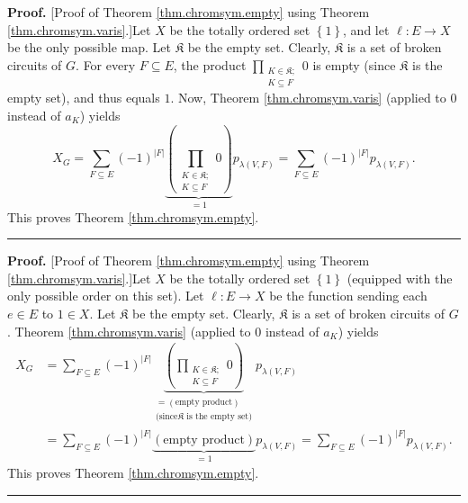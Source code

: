 \documentclass[numbers=enddot,12pt,final,onecolumn,notitlepage]{scrartcl}%
\theoremstyle{definition}
\newenvironment{proof}[1][Proof]{\noindent\textbf{#1.} }{\ \rule{0.5em}{0.5em}}
\newenvironment{verlong}{}{}
\newenvironment{vershort}{}{}
\let\sumnonlimits\sum
\let\prodnonlimits\prod
\renewcommand{\sum}{\sumnonlimits\limits}
\renewcommand{\prod}{\prodnonlimits\limits}
\begin{document}
\begin{vershort}
\begin{proof}
[Proof of Theorem \ref{thm.chromsym.empty} using Theorem
\ref{thm.chromsym.varis}.]Let $X$ be the totally ordered set $\left\{
1\right\}  $, and let $\ell:E\rightarrow X$ be the only possible map. Let
$\mathfrak{K}$ be the empty set. Clearly, $\mathfrak{K}$ is a set of broken
circuits of $G$. For every $F\subseteq E$, the product $\prod_{\substack{K\in
\mathfrak{K};\\K\subseteq F}}0$ is empty (since $\mathfrak{K}$ is the empty
set), and thus equals $1$. Now, Theorem \ref{thm.chromsym.varis} (applied to
$0$ instead of $a_{K}$) yields%
\[
X_{G}=\sum_{F\subseteq E}\left(  -1\right)  ^{\left\vert F\right\vert
}\underbrace{\left(  \prod_{\substack{K\in\mathfrak{K};\\K\subseteq
F}}0\right)  }_{=1}p_{\lambda\left(  V,F\right)  }=\sum_{F\subseteq E}\left(
-1\right)  ^{\left\vert F\right\vert }p_{\lambda\left(  V,F\right)  }.
\]
This proves Theorem \ref{thm.chromsym.empty}.
\end{proof}
\end{vershort}

\begin{verlong}
\begin{proof}
[Proof of Theorem \ref{thm.chromsym.empty} using Theorem
\ref{thm.chromsym.varis}.]Let $X$ be the totally ordered set $\left\{
1\right\}  $ (equipped with the only possible order on this set). Let
$\ell:E\rightarrow X$ be the function sending each $e\in E$ to $1\in X$. Let
$\mathfrak{K}$ be the empty set. Clearly, $\mathfrak{K}$ is a set of broken
circuits of $G$. Theorem \ref{thm.chromsym.varis} (applied to $0$ instead of
$a_{K}$) yields%
\begin{align*}
X_{G}  &  =\sum_{F\subseteq E}\left(  -1\right)  ^{\left\vert F\right\vert
}\underbrace{\left(  \prod_{\substack{K\in\mathfrak{K};\\K\subseteq
F}}0\right)  }_{\substack{=\left(  \text{empty product}\right)  \\\text{(since
}\mathfrak{K}\text{ is the empty set)}}}p_{\lambda\left(  V,F\right)  }\\
&  =\sum_{F\subseteq E}\left(  -1\right)  ^{\left\vert F\right\vert
}\underbrace{\left(  \text{empty product}\right)  }_{=1}p_{\lambda\left(
V,F\right)  }=\sum_{F\subseteq E}\left(  -1\right)  ^{\left\vert F\right\vert
}p_{\lambda\left(  V,F\right)  }.
\end{align*}
This proves Theorem \ref{thm.chromsym.empty}.
\end{proof}
\end{verlong}
\end{document}
